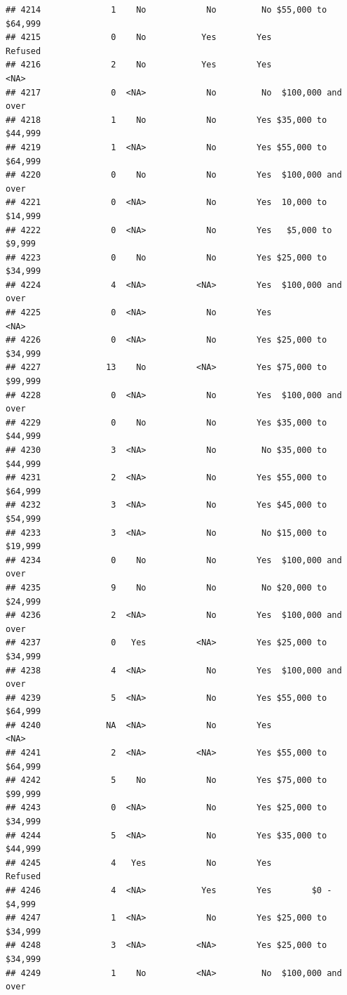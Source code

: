 \documentclass[man]{apa6}
\begin{document}
\begin{verbatim}
## 4214              1    No            No         No $55,000 to $64,999
## 4215              0    No           Yes        Yes            Refused
## 4216              2    No           Yes        Yes               <NA>
## 4217              0  <NA>            No         No  $100,000 and over
## 4218              1    No            No        Yes $35,000 to $44,999
## 4219              1  <NA>            No        Yes $55,000 to $64,999
## 4220              0    No            No        Yes  $100,000 and over
## 4221              0  <NA>            No        Yes  10,000 to $14,999
## 4222              0  <NA>            No        Yes   $5,000 to $9,999
## 4223              0    No            No        Yes $25,000 to $34,999
## 4224              4  <NA>          <NA>        Yes  $100,000 and over
## 4225              0  <NA>            No        Yes               <NA>
## 4226              0  <NA>            No        Yes $25,000 to $34,999
## 4227             13    No          <NA>        Yes $75,000 to $99,999
## 4228              0  <NA>            No        Yes  $100,000 and over
## 4229              0    No            No        Yes $35,000 to $44,999
## 4230              3  <NA>            No         No $35,000 to $44,999
## 4231              2  <NA>            No        Yes $55,000 to $64,999
## 4232              3  <NA>            No        Yes $45,000 to $54,999
## 4233              3  <NA>            No         No $15,000 to $19,999
## 4234              0    No            No        Yes  $100,000 and over
## 4235              9    No            No         No $20,000 to $24,999
## 4236              2  <NA>            No        Yes  $100,000 and over
## 4237              0   Yes          <NA>        Yes $25,000 to $34,999
## 4238              4  <NA>            No        Yes  $100,000 and over
## 4239              5  <NA>            No        Yes $55,000 to $64,999
## 4240             NA  <NA>            No        Yes               <NA>
## 4241              2  <NA>          <NA>        Yes $55,000 to $64,999
## 4242              5    No            No        Yes $75,000 to $99,999
## 4243              0  <NA>            No        Yes $25,000 to $34,999
## 4244              5  <NA>            No        Yes $35,000 to $44,999
## 4245              4   Yes            No        Yes            Refused
## 4246              4  <NA>           Yes        Yes        $0 - $4,999
## 4247              1  <NA>            No        Yes $25,000 to $34,999
## 4248              3  <NA>          <NA>        Yes $25,000 to $34,999
## 4249              1    No          <NA>         No  $100,000 and over

\end{verbatim}
\end{document}
